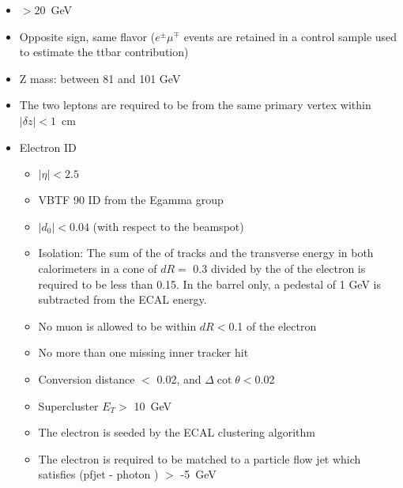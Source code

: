 \begin{itemize}
\item \pt $> 20$~GeV
\item Opposite sign, same flavor ($e^\pm\mu^\mp$ events are retained in a control sample used to estimate the ttbar contribution)
\item Z mass: between 81 and 101 GeV
\item The two leptons are required to be from the same primary vertex within $|\delta z|<1$~cm
\item Electron ID
  \begin{itemize}
  \item $|\eta| < 2.5$
  \item VBTF 90 ID from the Egamma group\cite{ref:vbtf}
  \item $|d_0| <0.04$ (with respect to the beamspot)
  \item Isolation: The sum of the \pt of tracks and the transverse energy in both calorimeters in a cone of $dR =$ 0.3 divided by the \pt of the electron is required to be less than 0.15. In the barrel only, a pedestal of 1 GeV is subtracted from the ECAL energy.
  \item No muon is allowed to be within $dR < $0.1 of the electron
  \item No more than one missing inner tracker hit
  \item Conversion distance $<$ 0.02, and $\Delta\cot\theta < $0.02\cite{ref:conv}
  \item Supercluster $E_T >$ 10~GeV
  \item The electron is seeded by the ECAL clustering algorithm
  \item The electron is required to be matched to a particle flow jet which satisfies (pfjet \pt - photon \pt) $>$ -5~GeV
  \end{itemize}




\end{itemize}
